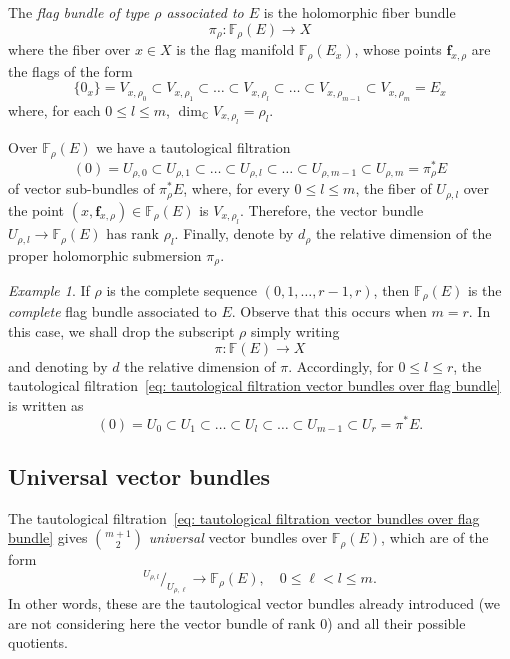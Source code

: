 \documentclass[a4paper]{amsart}
\theoremstyle{plain}%
\theoremstyle{definition}
\theoremstyle{remark}
\newtheorem{example}[theorem]{Example}
\newcommand{\C}{\mathbb{C}}
\newcommand{\FF}{\mathbb{F}}
\begin{document}
The \emph{flag bundle of type $ \rho $ associated to $ E $} is the holomorphic fiber bundle
\[
\pi_{\rho} \colon \FF_{\rho}(E) \to X
\]
where the fiber over $ x \in X $ is the flag manifold $ \FF_{\rho}(E_x) $, whose points $ \mathbf{f}_{x,\rho} $ are the flags of the form
\[
\{ 0_{x} \} = V_{x,\rho_0} \subset V_{x,\rho_1} \subset \dots \subset V_{x,\rho_l} \subset \dots \subset V_{x,\rho_{m-1}} \subset V_{x,\rho_m} = E_{x}
\]
where, for each $ 0 \le l \le m $, $ \dim_{\C} V_{x,\rho_l} = \rho_l $.

Over $ \FF_{\rho}(E) $ we have a tautological filtration
\begin{equation}\label{eq: tautological filtration vector bundles over flag bundle}
	(0) = U_{\rho,0} \subset U_{\rho,1} \subset \dots \subset U_{\rho,l} \subset \dots \subset U_{\rho,m-1} \subset U_{\rho,m} = \pi_{\rho}^{*}E
\end{equation}
of vector sub-bundles of $ \pi_{\rho}^{*}E $, where, for every $ 0 \le l \le m $, the fiber of $ U_{\rho,l} $ over the point $ (x,\mathbf{f}_{x,\rho}) \in \FF_{\rho}(E) $ is $ V_{x,\rho_l} $.
Therefore, the vector bundle $ U_{\rho,l} \to \FF_{\rho}(E) $ has rank $ \rho_l $.
Finally, denote by $ d_\rho $ the relative dimension of the proper holomorphic submersion $ \pi_{\rho} $.

\begin{example}
	If $ \rho $ is the complete sequence $ (0,1,\dots,r-1,r) $, then $ \FF_{\rho}(E) $ is the \emph{complete} flag bundle associated to $ E $.
	Observe that this occurs when $ m = r $.
	In this case, we shall drop the subscript $ \rho $ simply writing
	\[
	\pi \colon \FF(E) \to X
	\]
	and denoting by $ d $ the relative dimension of $ \pi $.
	Accordingly, for $ 0 \le l \le r $, the tautological filtration~\eqref{eq: tautological filtration vector bundles over flag bundle} is written as
	\begin{equation*}
		(0) = U_{0} \subset U_{1} \subset \dots \subset U_{l} \subset \dots \subset U_{m-1} \subset U_{r} = \pi^{*}E .
	\end{equation*}
\end{example}

\subsection{Universal vector bundles}
The tautological filtration~\eqref{eq: tautological filtration vector bundles over flag bundle} gives $ \binom{m+1}{2} $ \emph{universal} vector bundles over $ \FF_{\rho}(E) $, which are of the form
\[
^{\textstyle U_{\rho,{l}}}\Big/_{\textstyle U_{\rho,{\ell}}} \to \FF_{\rho}(E), \quad 0 \le \ell < l \le m .
\]
In other words, these are the tautological vector bundles already introduced (we are not considering here the vector bundle of rank $ 0 $) and all their possible quotients.
\end{document}
